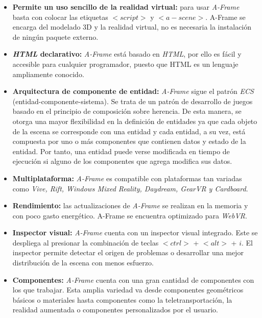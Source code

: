 \begin{itemize}
    \item \textbf{Permite un uso sencillo de la realidad virtual:} para usar \textit{A-Frame} basta con colocar las etiquetas $<script>$ y $<a-scene>$. A-Frame se encarga del modelado 3D y la realidad virtual, no es necesaria la instalación de ningún paquete externo.
    \item \textbf{\textit{HTML} declarativo:} \textit{A-Frame} está basado en \textit{HTML}, por ello es fácil y accesible para cualquier programador, puesto que HTML es un lenguaje ampliamente conocido.
    \item \textbf{Arquitectura de componente de entidad:} \textit{A-Frame} sigue el patrón \textit{ECS} (entidad-componente-sistema). Se trata de un patrón de desarrollo de juegos basado en el principio de composición sobre herencia. De esta manera, se otorga una mayor flexibilidad en la definición de entidades ya que cada objeto de la escena se corresponde con una entidad y cada entidad, a su vez, está compuesta por uno o más componentes que contienen datos y estado de la entidad. Por tanto, una entidad puede verse modificada en tiempo de ejecución si alguno de los componentes que agrega modifica sus datos.
    \item \textbf{Multiplataforma: } \textit{A-Frame} es compatible con plataformas tan variadas como \textit{Vive, Rift, Windows Mixed Reality, Daydream, GearVR y Cardboard}.
    \item \textbf{Rendimiento:} las actualizaciones de \textit{A-Frame} se realizan en la memoria y con poco gasto energético. A-Frame se encuentra optimizado para \textit{WebVR}.
    \item  \textbf{Inspector visual:} \textit{A-Frame} cuenta con un inspector visual integrado. Este se despliega al presionar la combinación de teclas $<ctrl>$ + $<alt>$ + $i$. El inspector permite detectar el origen de problemas o desarrollar una mejor distribución de la escena con menos esfuerzo.
    \item \textbf{Componentes:} \textit{A-Frame} cuenta con una gran cantidad de componentes con los que trabajar. Esta amplia variedad va desde componentes geométricos básicos o materiales hasta componentes como la teletransportación, la realidad aumentada o componentes personalizados por el usuario.
\end{itemize}


